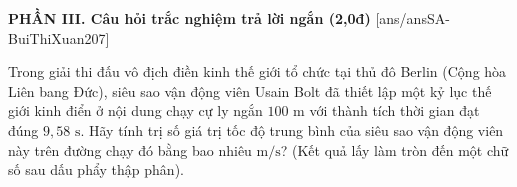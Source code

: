 	
	\noindent \textbf{PHẦN III. Câu hỏi trắc nghiệm trả lời ngắn (2,0đ)}
	[ans/ansSA-BuiThiXuan207]
	
	\begin{ex}%
		Trong giải thi đấu vô địch điền kinh thế giới tổ chức tại thủ đô Berlin (Cộng hòa Liên bang Đức), siêu sao vận động viên Usain Bolt đã thiết lập một kỷ lục thế giới kinh điển ở nội dung chạy cự ly ngắn $100\text{ m}$ với thành tích thời gian đạt đúng $9,58\text{ s}$. Hãy tính trị số giá trị tốc độ trung bình của siêu sao vận động viên này trên đường chạy đó bằng bao nhiêu $\text{m/s}$? (Kết quả lấy làm tròn đến một chữ số sau dấu phẩy thập phân).
	\end{ex}
	
